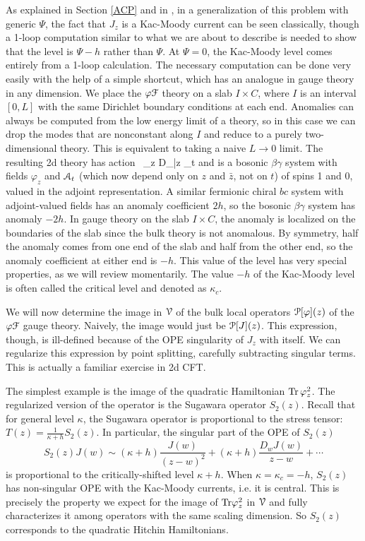 \documentclass[11pt,a4paper]{article}
\begin{document}
As explained in Section \ref{ACP} and in \cite{Gaiotto:2017euk}, in a generalization of this problem with generic $\Psi$, the fact that $J_z$ is a Kac-Moody
current can be seen classically, though a 1-loop computation similar to what we are about to describe is needed to show that the level is $\Psi-h$ rather than
$\Psi$.   At $\Psi=0$, the Kac-Moody level comes entirely from a 1-loop calculation.   The necessary computation can be done very easily with the help
of  
 a simple shortcut, which has an analogue in gauge theory in any dimension.
 We place the $\varphi{\mathcal F}$ theory on a slab $I\times C$, where $I$ is an interval $[0,L]$ with the same Dirichlet boundary conditions at each end.   
 Anomalies can always be computed from the low energy limit of a theory, so in this case we can drop the modes that are nonconstant along $I$
 and reduce to a purely two-dimensional theory.   This is equivalent to taking a naive $L\to 0$ limit.
The resulting 2d theory has action 
\be\label{belaction}
\int \Tr \, \varphi_z D_{\bar z} \cA_t\ee
and is a bosonic $\beta \gamma$ system with fields $\varphi_z$ and ${\mathcal A}_t$ (which now depend  only on $z$ and $\bar z$, not on $t$) of spins 1 and 0, valued in the adjoint representation. 
A similar fermionic chiral $bc$ system with adjoint-valued fields  has  an anomaly coefficient $2h$, so the bosonic $\beta\gamma$ system has anomaly  $-2h$.
In gauge theory on the slab $I\times C$, the anomaly is localized on the boundaries of the slab since the bulk theory is not anomalous.
By symmetry,  half the anomaly comes from one end of the slab and half from the other end, so the anomaly coefficient at either end is $-h$.   This value of the level
has very special properties, as we will review momentarily.   The value $-h$ of the Kac-Moody level is often called the critical level and denoted as $\kappa_c$.

We will now determine the image in ${\cal V}$ of the bulk local operators 
${\cal P}[\varphi](z)$ 
of the $\varphi{\mathcal F}$ gauge theory.
 Naively, the image would just be 
${\cal P}[J](z)$. This expression, though, is ill-defined because of the OPE singularity of $J_z$ with itself. We can regularize this expression by point splitting, carefully subtracting singular terms. This is actually a familiar exercise in 2d CFT. 

The simplest example is the image of the quadratic Hamiltonian ${\rm Tr}\, \varphi_z^2$. The regularized version of the operator 
is the Sugawara operator $S_2(z)$. Recall that for general level $\kappa$, the Sugawara operator is proportional to the stress tensor: $T(z) = \frac{1}{\kappa + h} S_2(z)$. In particular, the singular part of the OPE of $S_2(z)$ 
\begin{equation}
S_2(z) J(w) \sim (\kappa + h)\frac{J(w)}{(z-w)^2} + (\kappa + h) \frac{D_w J(w)}{z-w} + \cdots
\end{equation}
is proportional to the critically-shifted level $\kappa+h$. When $\kappa=\kappa_c=-h$, $S_2(z)$ has non-singular OPE with the Kac-Moody currents, i.e. it is central. This is precisely the property we expect  for the image of ${\rm Tr} \varphi_z^2$ in ${\cal V}$ and fully characterizes it 
among operators with the same scaling dimension.   So $S_2(z)$ corresponds to the quadratic Hitchin Hamiltonians.
\end{document}
